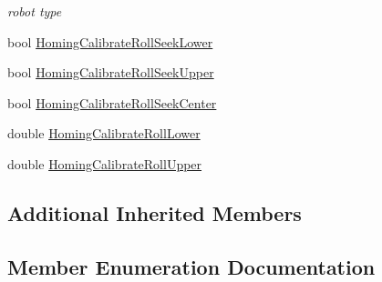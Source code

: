\begin{DoxyCompactItemize}
\begin{DoxyCompactList}\small\item\em robot type \end{DoxyCompactList}\item 
bool \hyperlink{classmts_intuitive_research_kit_m_t_m_a903a6511516f4c55339303d54c9e34cc}{Homing\+Calibrate\+Roll\+Seek\+Lower}
\item 
bool \hyperlink{classmts_intuitive_research_kit_m_t_m_acbc506129e490dc537aa79e2a2ef97d8}{Homing\+Calibrate\+Roll\+Seek\+Upper}
\item 
bool \hyperlink{classmts_intuitive_research_kit_m_t_m_a436e19a4e45e73d1c02855c5dedc3b68}{Homing\+Calibrate\+Roll\+Seek\+Center}
\item 
double \hyperlink{classmts_intuitive_research_kit_m_t_m_a8be0d493c6060fc1c457d22bb6be9cbf}{Homing\+Calibrate\+Roll\+Lower}
\item 
double \hyperlink{classmts_intuitive_research_kit_m_t_m_aeef2dd3b27fabd87ce88152e605f385f}{Homing\+Calibrate\+Roll\+Upper}
\end{DoxyCompactItemize}
\subsection*{Additional Inherited Members}


\subsection{Member Enumeration Documentation}
\hypertarget{classmts_intuitive_research_kit_m_t_m_a76e15ff0552b14b45abb0aaa26cb122d}{}
